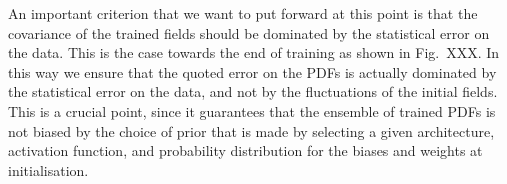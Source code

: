 An important criterion that we want to put forward at this point is that the
covariance of the trained fields should be dominated by the statistical error on
the data. This is the case towards the end of training as shown in Fig.~XXX. In
this way we ensure that the quoted error on the PDFs is actually dominated by
the statistical error on the data, and not by the fluctuations of the initial
fields. This is a crucial point, since it guarantees that the ensemble of
trained PDFs is not biased by the choice of prior that is made by selecting a
given architecture, activation function, and probability distribution for the
biases and weights at initialisation.

\FloatBarrier
